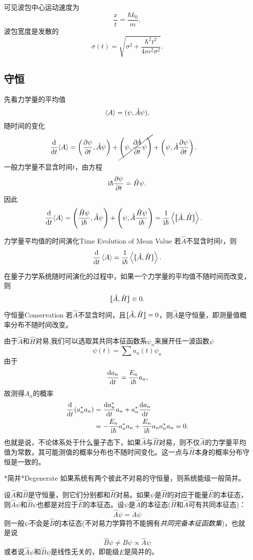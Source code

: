 可见波包中心运动速度为
\[
	\frac xt=\frac{\hbar k_0}m,
\]
波包宽度是发散的
\[
	\sigma(t)=\sqrt{\sigma^2+\frac{\hbar^2t^2}{4m^2\sigma^2}}.
\]
\subsection{守恒}
先看力学量的平均值
\[
	\left\langle A\right\rangle=(\psi,\hat A\psi),
\]
随时间的变化
\begin{align*}
	\dd t{\ave A} & =\kh{\pv\psi{t},\hat A\psi}+\cancel{\kh{\psi,\pv{\!\hat A}t\psi}}+\kh{\psi,\hat A\pv{\psi}t}.
\end{align*}
一般力学量不显含时间$t$，由\Schr 方程
\[
	\mathrm{i}\hbar\frac{\partial^{\;\!\!}\psi}{\partial t^{\;\!\!}}=\hat H\psi.
\]
因此
\begin{align*}
	\dd t{\ave A} & =\kh{\frac{\hat H\psi}{\i\hbar},\hat A\psi}+\kh{\psi,\hat A\frac{\hat H\psi}{\i\hbar}}
	=\frac1{\i\hbar}\ave{\cmm AH}. %
\end{align*}
\begin{theorem}{力学量平均值的时间演化}{Time Evolution of Mean Value}
	若$\hat A$不显含时间$t$，则
	\begin{align}
		\dd t\ave A=\frac1{\i\hbar}\ave{\cmm AH}.
	\end{align}
\end{theorem}
在量子力学系统随时间演化的过程中，如果一个力学量的平均值不随时间而改变，则
\[
	\lfloor\hspace{-4.7 pt}\lceil \hat A,\hat H\rceil\hspace{-4.7 pt}\rfloor\equiv 0.
\]
\begin{theorem}{守恒量}{Conservation}
	若$\hat A$不显含时间，且$\lfloor\hspace{-4.7 pt}\lceil \hat A,\hat H\rceil\hspace{-4.7 pt}\rfloor=0$，则$\hat A$是守恒量，即测量值概率分布不随时间改变。
\end{theorem}
由于$\hat A$和$\hat H$对易,我们可以选取其共同本征函数系$\psi_n$来展开任一波函数$\psi$
\[
	\psi(t)=\sum a_n(t)\psi_n
\]
由于
\[
	\frac{\mathrm{d}^{\;\!\!}a_n}{\mathrm{d} t^{\;\!\!}}=\frac{E_n}{\mathrm{i}\hbar}a_n,
\]
故测得$A_n$的概率
\begin{align*}
	\dd t(a_n^*a_n) & =\dv{a_n\cj}ta_n+a_n\cj\dv{a_n}t                                    \\
	                & =-\frac{E_n}{\i\hbar}a_n\cj a_n+\frac{E_n}{\i\hbar}a_na_n\cj a_n=0.
\end{align*}
也就是说，不论体系处于什么量子态下，如果$\hat A$与$\hat H$对易，则不仅$\hat A$的力学量平均值为常数，其可能测值的概率分布也不随时间变化。这一点与$\hat H$本身的概率分布守恒是一致的。

\begin{theorem}{*简并}{*Degenerate}
	如果系统有两个彼此不对易的守恒量，则系统能级一般简并。
\end{theorem}
设$\hat A$和$\hat B$是守恒量，则它们分别都和$\hat H$对易。如果$\psi$是$\hat H$的对应于能量$\hat E$的本征态，则$\hat A\psi$和$\hat B\psi$也都是对应于$\hat E$的本征态。设$\psi$是$\hat A$的本征态($\hat H$和$\hat A$可有共同本征态)：
\[
	\hat A\psi=A\psi
\]
则一般$\psi$不会是$\hat B$的本征态(不对易力学算符不能拥有\textit{共同完备本征函数集})，也就是说
\[
	\hat B\psi\neq B\psi\propto\hat A\psi
\]
或者说$\hat A\psi$和$\hat B\psi$是线性无关的，即能级$E$是简并的。

